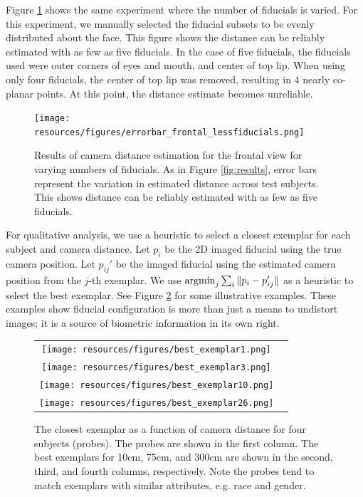 \documentclass[runningheads]{llncs}
\newcommand{\argmin}{\operatornamewithlimits{argmin}}
\newcommand {\afbnote} [1] {{\bf \textcolor{red}{(#1)}}}
\begin{document}
Figure \ref{fig:error_bar_frontal_lessfiducials} shows the same experiment where the number of fiducials is varied.  
For this experiment, we manually selected the fiducial subsets to be evenly distributed about the face.  
This figure shows the distance can be reliably estimated with as few as five fiducials.  
In the case of five fiducials, the fiducials used were outer corners of eyes and mouth, and center of top lip.
When using only four fiducials, the center of top lip was removed, resulting in 4 nearly co-planar points.
At this point, the distance estimate becomes unreliable.

\begin{figure}[h]
\centering
\texttt{[image: resources/figures/errorbar\_frontal\_lessfiducials.png]}
\caption{
Results of camera distance estimation for the frontal view for varying numbers of fiducials.
As in Figure \ref{fig:results}, error bars represent the variation in estimated distance across test subjects.
This shows distance can be reliably estimated with as few as five fiducials.
}
\label{fig:error_bar_frontal_lessfiducials}
\end{figure}

For qualitative analysis, we use a heuristic to select a closest exemplar for each subject and camera distance.  
Let $p_i$ be the 2D imaged fiducial using the true camera position.  
Let $p_{ij}'$ be the imaged fiducial using the estimated camera position from the $j$-th exemplar.
We use $\argmin_j \sum_i \|p_i - p_{ij}'\|$ as a heuristic to select the best exemplar. 
See Figure \ref{fig:bestexemplar} for some illustrative examples.
These examples show fiducial configuration is more than just a means to undistort images; it is a source of biometric information in its own right.

\begin{figure}[ht!]
\centering
\begin{tabular}{cc}
\texttt{[image: resources/figures/best\_exemplar1.png]} \\
\texttt{[image: resources/figures/best\_exemplar3.png]} \\
\texttt{[image: resources/figures/best\_exemplar10.png]} \\
\texttt{[image: resources/figures/best\_exemplar26.png]}
\end{tabular}
\caption{
The closest exemplar as a function of camera distance for four subjects (probes).
The probes are shown in the first column.
The best exemplars for 10cm, 75cm, and 300cm are shown in the second, third, and fourth columns, respectively.
Note the probes tend to match exemplars with similar attributes, e.g. race and gender.
}
\label{fig:bestexemplar}
\end{figure}
\end{document}
